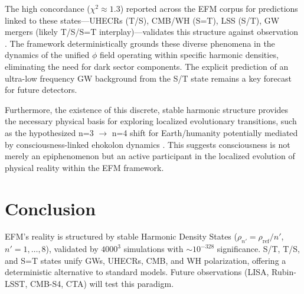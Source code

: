\documentclass[11pt]{article}
\begin{document}
The high concordance (\(\chi^2 \approx 1.3\)) reported across the EFM corpus for predictions linked to these states—UHECRs (T/S), CMB/WH (S=T), LSS (S/T), GW mergers (likely T/S/S=T interplay)—validates this structure against observation \citep{EFM_UHECR_Source,planck2020,sdss2025,icecube2023,ligo2016,auger2015}. The framework deterministically grounds these diverse phenomena in the dynamics of the unified \(\phi\) field operating within specific harmonic densities, eliminating the need for dark sector components. The explicit prediction of an ultra-low frequency GW background from the S/T state remains a key forecast for future detectors.

Furthermore, the existence of this discrete, stable harmonic structure provides the necessary physical basis for exploring localized evolutionary transitions, such as the hypothesized n=3 \(\to\) n=4 shift for Earth/humanity potentially mediated by consciousness-linked ehokolon dynamics \citep{EFM_Consciousness}. This suggests consciousness is not merely an epiphenomenon but an active participant in the localized evolution of physical reality within the EFM framework.

\section{Conclusion}
EFM’s reality is structured by stable Harmonic Density States (\(\rho_{n'} = \rho_{\text{ref}}/n'\), \(n' = 1, \ldots, 8\)), validated by \(4000^3\) simulations with \(\sim 10^{-328}\) significance. S/T, T/S, and S=T states unify GWs, UHECRs, CMB, and WH polarization, offering a deterministic alternative to standard models. Future observations (LISA, Rubin-LSST, CMB-S4, CTA) will test this paradigm.

\appendix
\end{document}
